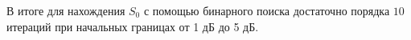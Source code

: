 В итоге для нахождения $S_0$ с помощью бинарного поиска достаточно порядка $10$ итераций при начальных
границах от 1 дБ до 5 дБ.




















































































